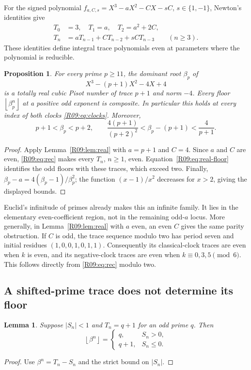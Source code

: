 \documentclass[11pt,a4paper]{article}
\newtheorem{lemma}[theorem]{Lemma}\newtheorem{proposition}[theorem]{Proposition}
\theoremstyle{definition}\newtheorem{definition}[theorem]{Definition}
\theoremstyle{remark}\newtheorem{remark}[theorem]{Remark}
\newcommand{\floor}[1]{\left\lfloor#1\right\rfloor}
\begin{document}
For the signed polynomial $f_{a,C,s}=X^3-aX^2-CX-sC$, $s\in\{1,-1\}$,
Newton's identities give
\begin{equation}\label{R09:eq:rec}
\begin{split}
 T_0&=3,\quad T_1=a,\quad T_2=a^2+2C,\\
 T_n&=aT_{n-1}+CT_{n-2}+sCT_{n-3}\qquad(n\ge3).
\end{split}
\end{equation}
These identities define integral trace polynomials even at parameters
where the polynomial is reducible.

\begin{proposition}\label{R09:prop:even}
For every prime $p\ge11$, the dominant root $\beta_p$ of
\[
 X^3-(p+1)X^2-4X+4
\]
is a totally real cubic Pisot number of trace $p+1$ and norm $-4$.
Every floor $\floor{\beta_p^n}$ at a positive odd exponent is composite.
In particular this holds at every index of both clocks \eqref{R09:eq:clocks}.
Moreover,
\[
 p+1<\beta_p<p+2,\qquad
 \frac{4(p+1)}{(p+2)^2}<\beta_p-(p+1)<\frac4{p+1}.
\]
\end{proposition}
\begin{proof}
Apply Lemma~\ref{R09:lem:real} with $a=p+1$ and $C=4$.
Since $a$ and $C$ are even, \eqref{R09:eq:rec} makes every $T_n$, $n\ge1$,
even. Equation~\eqref{R09:eq:real-floor} identifies the odd floors with
these traces, which exceed two. Finally,
$\beta_p-a=4(\beta_p-1)/\beta_p^2$; the function
$(x-1)/x^2$ decreases for $x>2$, giving the displayed bounds.
\end{proof}

Euclid's infinitude of primes already makes this an infinite family.
It lies in the elementary even-coefficient region, not in the
remaining odd-$a$ locus. More generally, in Lemma~\ref{R09:lem:real} with
$a$ even, an even $C$ gives the same parity obstruction. If $C$ is odd,
the trace sequence modulo two has period seven and initial residues
$(1,0,0,1,0,1,1)$. Consequently its classical-clock traces are even
when $k$ is even, and its negative-clock traces are even when
$k\equiv0,3,5\pmod6$. This follows directly from \eqref{R09:eq:rec} modulo two.

\subsection{A shifted-prime trace does not determine its floor}

\begin{lemma}\label{R09:lem:sign}
Suppose $|S_n|<1$ and $T_n=q+1$ for an odd prime $q$. Then
\[
 \floor{\beta^n}=
 \begin{cases}q,&S_n>0,\\q+1,&S_n\le0.\end{cases}
\]
\end{lemma}
\begin{proof}
Use $\beta^n=T_n-S_n$ and the strict bound on $|S_n|$.
\end{proof}
\end{document}
